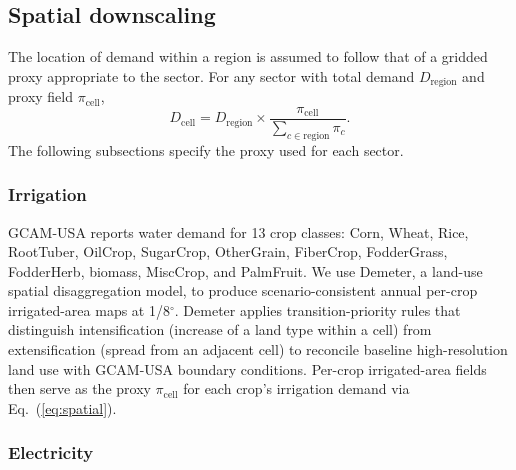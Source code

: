 \documentclass[fleqn,10pt]{wlscirep}
\begin{document}
\subsection*{Spatial downscaling}

The location of demand within a region is assumed to follow that of a gridded proxy appropriate to the sector. For any sector with total demand $D_{\mathrm{region}}$ and proxy field $\pi_{\mathrm{cell}}$,
\begin{equation}
D_{\mathrm{cell}} = D_{\mathrm{region}} \times \frac{\pi_{\mathrm{cell}}}{\sum_{c \in \mathrm{region}} \pi_{c}}.
\label{eq:spatial}
\end{equation}
The following subsections specify the proxy used for each sector.

\subsubsection*{Irrigation}

GCAM-USA reports water demand for 13 crop classes: Corn, Wheat, Rice, RootTuber, OilCrop, SugarCrop, OtherGrain, FiberCrop, FodderGrass, FodderHerb, biomass, MiscCrop, and PalmFruit. We use Demeter\cite{Vernon-2018}, a land-use spatial disaggregation model, to produce scenario-consistent annual per-crop irrigated-area maps at 1/8$^{\circ}$. Demeter applies transition-priority rules that distinguish intensification (increase of a land type within a cell) from extensification (spread from an adjacent cell) to reconcile baseline high-resolution land use with GCAM-USA boundary conditions. Per-crop irrigated-area fields then serve as the proxy $\pi_{\mathrm{cell}}$ for each crop's irrigation demand via Eq.~(\ref{eq:spatial}).

\subsubsection*{Electricity}
\end{document}
